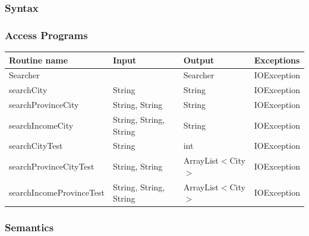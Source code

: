 \documentclass[12pt,fleqn]{article}
\begin{document}
\subsubsection* {Syntax}

\subsubsection* {Access Programs}
\begin{tabular}{| l | l | l | l |}
\hline
\textbf{Routine name} & \textbf{Input} & \textbf{Output} & \textbf{Exceptions}\\
\hline
Searcher & ~ & Searcher & IOException\\
\hline
searchCity & String & String & IOException\\
\hline
searchProvinceCity & String, String & String& IOException\\
\hline
searchIncomeCity & String, String, String & String & IOException\\
\hline
searchCityTest & String & int & IOException\\
\hline
searchProvinceCityTest & String, String & ArrayList$<$City$>$ & IOException\\
\hline
searchIncomeProvinceTest & String, String, String & ArrayList$<$City$>$ & IOException\\
\hline
\end{tabular}

\subsubsection*{Semantics}
\end{document}

